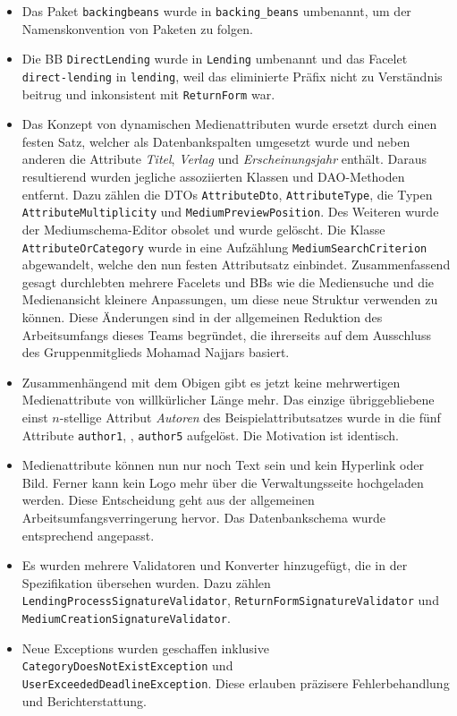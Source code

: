 \documentclass{article}
\begin{document}
\begin{itemize}
    \item Das Paket \texttt{backingbeans} wurde in \texttt{backing\_beans} umbenannt, um der Namenskonvention von Paketen zu folgen.
    \item Die BB \texttt{DirectLending} wurde in \texttt{Lending} umbenannt und das Facelet \texttt{direct-lending} in \texttt{lending}, weil das eliminierte Präfix nicht zu Verständnis beitrug und inkonsistent mit \texttt{ReturnForm} war.
    \item Das Konzept von dynamischen Medienattributen wurde ersetzt durch einen festen Satz, welcher als Datenbankspalten umgesetzt wurde und neben anderen die Attribute \textit{Titel}, \textit{Verlag} und \textit{Erscheinungsjahr} enthält. Daraus resultierend wurden jegliche assoziierten Klassen und DAO-Methoden entfernt.
    Dazu zählen die DTOs \texttt{AttributeDto}, \texttt{AttributeType}, die Typen \texttt{AttributeMultiplicity} und \texttt{MediumPreviewPosition}. Des Weiteren wurde der Mediumschema-Editor obsolet und wurde gelöscht. Die Klasse \texttt{AttributeOrCategory} wurde in eine Aufzählung \texttt{MediumSearchCriterion} abgewandelt, welche den nun festen Attributsatz einbindet. Zusammenfassend gesagt durchlebten mehrere Facelets und BBs wie die Mediensuche und die Medienansicht kleinere Anpassungen, um diese neue Struktur verwenden zu können.
    Diese Änderungen sind in der allgemeinen Reduktion des Arbeitsumfangs dieses Teams begründet, die ihrerseits auf dem Ausschluss des Gruppenmitglieds Mohamad Najjars basiert.
    \item Zusammenhängend mit dem Obigen gibt es jetzt keine mehrwertigen Medienattribute von willkürlicher Länge mehr. Das einzige übriggebliebene einst $n$-stellige Attribut \textit{Autoren} des Beispielattributsatzes wurde in die fünf Attribute \texttt{author1}, \textellipsis, \texttt{author5} aufgelöst. Die Motivation ist identisch.
    \item Medienattribute können nun nur noch Text sein und kein Hyperlink oder Bild. Ferner kann kein Logo mehr über die Verwaltungsseite hochgeladen werden. Diese Entscheidung geht aus der allgemeinen Arbeitsumfangsverringerung hervor. Das Datenbankschema wurde entsprechend angepasst.
    \item Es wurden mehrere Validatoren und Konverter hinzugefügt, die in der Spezifikation übersehen wurden. Dazu zählen \texttt{LendingProcessSignatureValidator}, \texttt{ReturnFormSignatureValidator} und \texttt{MediumCreationSignatureValidator}.
    \item Neue Exceptions wurden geschaffen inklusive \texttt{CategoryDoesNotExistException} und\\ \texttt{UserExceededDeadlineException}. Diese erlauben präzisere Fehlerbehandlung und Berichterstattung.

\end{itemize}
\end{document}
